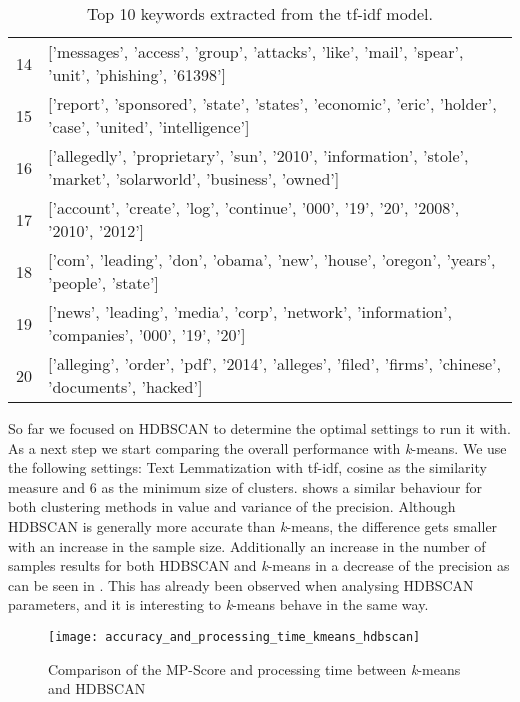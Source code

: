 \begin{table}[h]
{\begin{tabular}{rl}
            14 & ['messages', 'access', 'group', 'attacks', 'like', 'mail', 'spear', 'unit', 'phishing', '61398']                        \\
            15 & ['report', 'sponsored', 'state', 'states', 'economic', 'eric', 'holder', 'case', 'united', 'intelligence']              \\
            16 & ['allegedly', 'proprietary', 'sun', '2010', 'information', 'stole', 'market', 'solarworld', 'business', 'owned']        \\
            17 & ['account', 'create', 'log', 'continue', '000', '19', '20', '2008', '2010', '2012']                                     \\
            18 & ['com', 'leading', 'don', 'obama', 'new', 'house', 'oregon', 'years', 'people', 'state']                                \\
            19 & ['news', 'leading', 'media', 'corp', 'network', 'information', 'companies', '000', '19', '20']                          \\
            20 & ['alleging', 'order', 'pdf', '2014', 'alleges', 'filed', 'firms', 'chinese', 'documents', 'hacked']                     \\
        \hline
        \end{tabular}
        }
        \caption{Top 10 keywords extracted from the tf-idf model.}
        \label{tab:clustering_example_features}
\end{table}

So far we focused on HDBSCAN to determine the optimal settings to run it with.
As a next step we start comparing the overall performance with \textit{k}-means.
We use the following settings: Text Lemmatization with tf-idf,
cosine as the similarity measure and 6 as the minimum size of clusters.
 shows a similar behaviour
for both clustering methods in value and variance of the precision.
Although HDBSCAN is generally more accurate than \textit{k}-means,
the difference gets smaller with an increase in the sample size.
Additionally an increase in the number of samples results for both HDBSCAN
and \textit{k}-means in a decrease of the precision
as can be seen in .
This has already been observed when analysing HDBSCAN parameters, 
and it is interesting to \textit{k}-means behave in the same way.

\begin{figure}[h]
    \centering
    \texttt{[image: accuracy\_and\_processing\_time\_kmeans\_hdbscan]}
    \caption{Comparison of the MP-Score and processing time between \textit{k}-means and HDBSCAN}
    \label{fig:precision_and_processing_time_kmeans_hdbscan}
\end{figure}

